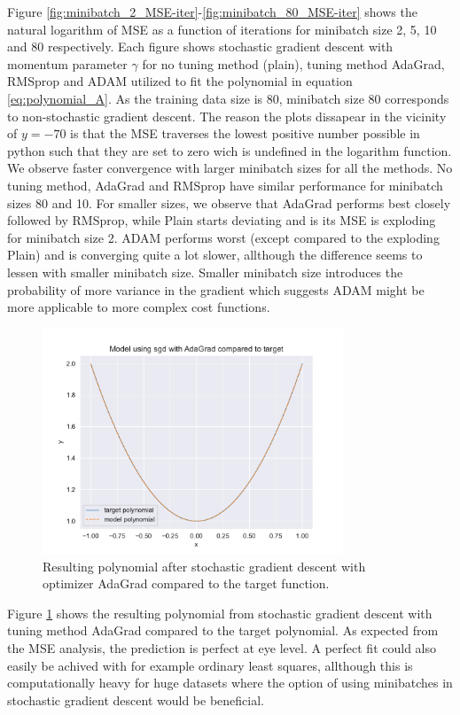 Figure \ref{fig:minibatch_2_MSE-iter}-\ref{fig:minibatch_80_MSE-iter} shows the natural logarithm of MSE as a function of iterations
for minibatch size 2, 5, 10 and 80 respectively. Each figure shows stochastic gradient descent with momentum parameter $\gamma $ for no tuning method (plain),
tuning method AdaGrad, RMSprop and ADAM utilized to fit the polynomial in equation \ref{eq:polynomial_A}. As the training data 
size is 80, minibatch size 80 corresponds to non-stochastic gradient descent. The reason the plots dissapear in the vicinity of $y=-70$ 
is that the MSE traverses the lowest positive number possible in python such that they are set to zero wich is undefined in the logarithm function. 
We observe faster convergence with larger minibatch sizes for all the methods. No tuning method, AdaGrad and RMSprop have similar performance for minibatch 
sizes 80 and 10. For smaller sizes, we observe that AdaGrad performs best closely followed by RMSprop, while Plain starts deviating and is its MSE is 
exploding for minibatch size 2. ADAM performs worst (except compared to the exploding Plain) and is converging quite a lot slower, allthough the difference 
seems to lessen with smaller minibatch size. Smaller minibatch size introduces the probability of more variance in the gradient which suggests ADAM might be more 
applicable to more complex cost functions.   


\begin{figure}[H]
\centering
\includegraphics[width=0.8\textwidth]{Figures/PartA/sgd_polynomial_fit}
\caption{Resulting polynomial after stochastic gradient descent with optimizer AdaGrad compared to the target function.}
\label{fig:sgd_polynomial_fit}
\end{figure}

Figure \ref{fig:sgd_polynomial_fit} shows the resulting polynomial from stochastic gradient descent with tuning method AdaGrad compared 
to the target polynomial. As expected from the MSE analysis, the prediction is perfect at eye level. A perfect fit could also easily be achived 
with for example ordinary least squares, allthough this is computationally heavy for huge datasets where the option of using minibatches in 
stochastic gradient descent would be beneficial. 

